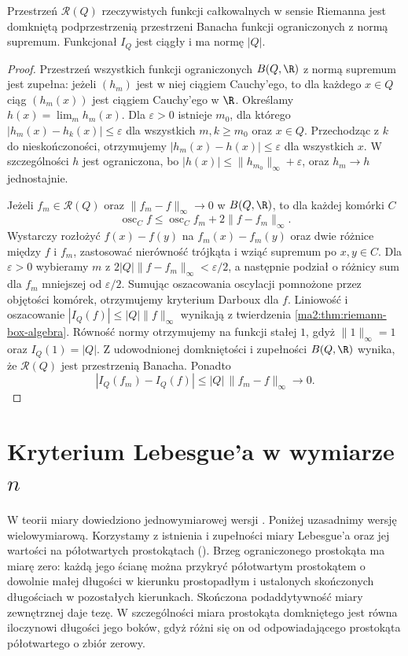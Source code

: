 \begin{twierdzenie}
\label{ma2:thm:riemann-box-uniform}
Przestrzeń $\mathcal R(Q)$ rzeczywistych funkcji
całkowalnych w sensie Riemanna jest domkniętą
podprzestrzenią przestrzeni Banacha funkcji
ograniczonych z normą supremum.
Funkcjonał $I_Q$ jest ciągły i ma normę $|Q|$.
\end{twierdzenie}
\begin{proof}
Przestrzeń wszystkich funkcji ograniczonych
$B(Q,\R)$ z normą supremum jest zupełna:
jeżeli $(h_m)$ jest w niej ciągiem Cauchy'ego,
to dla każdego $x\in Q$ ciąg $(h_m(x))$ jest
ciągiem Cauchy'ego w $\R$. Określamy
$h(x)=\lim_m h_m(x)$. Dla $\varepsilon>0$
istnieje $m_0$, dla którego
$|h_m(x)-h_k(x)|\le\varepsilon$ dla wszystkich
$m,k\ge m_0$ oraz $x\in Q$. Przechodząc
z $k$ do nieskończoności, otrzymujemy
$|h_m(x)-h(x)|\le\varepsilon$ dla wszystkich $x$.
W szczególności $h$ jest ograniczona, bo
$|h(x)|\le\|h_{m_0}\|_\infty+\varepsilon$,
oraz $h_m\to h$ jednostajnie.

Jeżeli $f_m\in\mathcal R(Q)$ oraz
$\|f_m-f\|_\infty\to0$ w $B(Q,\R)$,
to dla każdej komórki $C$
\[
 \operatorname{osc}_C f
 \le\operatorname{osc}_C f_m+2\|f-f_m\|_\infty.
\]
Wystarczy rozłożyć $f(x)-f(y)$ na $f_m(x)-f_m(y)$
oraz dwie różnice między $f$ i $f_m$, zastosować
nierówność trójkąta i wziąć supremum po $x,y\in C$.
Dla $\varepsilon>0$ wybieramy $m$ z
$2|Q|\|f-f_m\|_\infty<\varepsilon/2$, a następnie
podział o różnicy sum dla $f_m$ mniejszej
od $\varepsilon/2$. Sumując oszacowania oscylacji
pomnożone przez objętości komórek, otrzymujemy
kryterium Darboux dla $f$. Liniowość i oszacowanie
$|I_Q(f)|\le |Q|\|f\|_\infty$ wynikają z twierdzenia
\ref{ma2:thm:riemann-box-algebra}. Równość normy
otrzymujemy na funkcji stałej $1$, gdyż
$\|1\|_\infty=1$ oraz $I_Q(1)=|Q|$.
Z udowodnionej domkniętości i zupełności
$B(Q,\R)$ wynika, że $\mathcal R(Q)$
jest przestrzenią Banacha.
Ponadto
\[
 |I_Q(f_m)-I_Q(f)|\le|Q|\,\|f_m-f\|_\infty\to0.
\]
\end{proof}

\section{Kryterium Lebesgue'a w wymiarze \texorpdfstring{$n$}{n}}

W teorii miary dowiedziono jednowymiarowej wersji
.
Poniżej uzasadnimy wersję wielowymiarową.
Korzystamy z istnienia i zupełności miary Lebesgue'a
oraz jej wartości na półotwartych prostokątach
().
Brzeg ograniczonego prostokąta ma miarę zero:
każdą jego ścianę można przykryć półotwartym
prostokątem o dowolnie małej długości w kierunku
prostopadłym i ustalonych skończonych długościach
w pozostałych kierunkach. Skończona podaddytywność
miary zewnętrznej daje tezę. W szczególności
miara prostokąta domkniętego jest równa iloczynowi
długości jego boków, gdyż różni się on od
odpowiadającego prostokąta półotwartego o zbiór zerowy.

